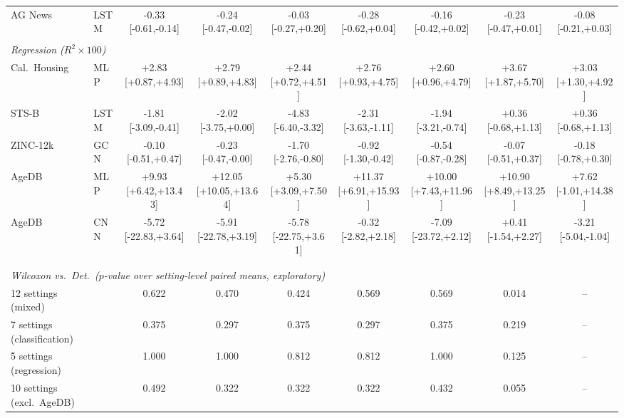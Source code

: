 \begin{table}[t]
\begin{center}
\begin{tabular}{llccccccc}
AG News & LSTM & -0.33 [-0.61,-0.14] & -0.24 [-0.47,-0.02] & -0.03 [-0.27,+0.20] & -0.28 [-0.62,+0.04] & -0.16 [-0.42,+0.02] & -0.23 [-0.47,+0.01] & -0.08 [-0.21,+0.03] \\
\\[-1.5ex]
\multicolumn{9}{l}{\emph{Regression ($R^2\times100$)}} \\[0.3ex]
Cal.\ Housing & MLP & +2.83 [+0.87,+4.93] & +2.79 [+0.89,+4.83] & +2.44 [+0.72,+4.51] & +2.76 [+0.93,+4.75] & +2.60 [+0.96,+4.79] & +3.67 [+1.87,+5.70] & +3.03 [+1.30,+4.92] \\
STS-B & LSTM & -1.81 [-3.09,-0.41] & -2.02 [-3.75,+0.00] & -4.83 [-6.40,-3.32] & -2.31 [-3.63,-1.11] & -1.94 [-3.21,-0.74] & +0.36 [-0.68,+1.13] & +0.36 [-0.68,+1.13] \\
ZINC-12k & GCN & -0.10 [-0.51,+0.47] & -0.23 [-0.47,-0.00] & -1.70 [-2.76,-0.80] & -0.92 [-1.30,-0.42] & -0.54 [-0.87,-0.28] & -0.07 [-0.51,+0.37] & -0.18 [-0.78,+0.30] \\
AgeDB & MLP & +9.93 [+6.42,+13.43] & +12.05 [+10.05,+13.64] & +5.30 [+3.09,+7.50] & +11.37 [+6.91,+15.93] & +10.00 [+7.43,+11.96] & +10.90 [+8.49,+13.25] & +7.62 [-1.01,+14.38] \\
AgeDB & CNN & -5.72 [-22.83,+3.64] & -5.91 [-22.78,+3.19] & -5.78 [-22.75,+3.61] & -0.32 [-2.82,+2.18] & -7.09 [-23.72,+2.12] & +0.41 [-1.54,+2.27] & -3.21 [-5.04,-1.04] \\
\\[-1.5ex]
\\[-1.5ex]
\multicolumn{9}{l}{\emph{Wilcoxon vs.\ Det.\ ($p$-value over setting-level paired means, exploratory)}} \\[0.3ex]
12 settings (mixed) & & 0.622 & 0.470 & 0.424 & 0.569 & 0.569 & 0.014 & -- \\
7 settings (classification) & & 0.375 & 0.297 & 0.375 & 0.297 & 0.375 & 0.219 & -- \\
5 settings (regression) & & 1.000 & 1.000 & 0.812 & 0.812 & 1.000 & 0.125 & -- \\
10 settings (excl.\ AgeDB) & & 0.492 & 0.322 & 0.322 & 0.322 & 0.432 & 0.055 & -- \\
\end{tabular}\end{center}\end{table}
